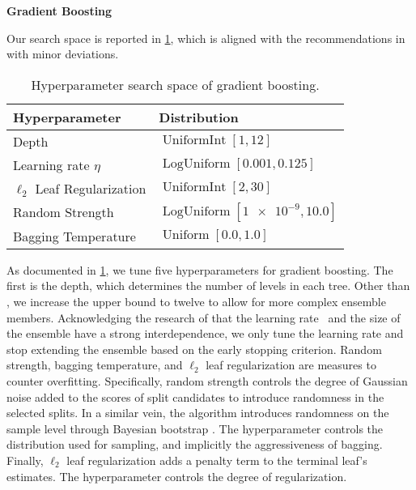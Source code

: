 \textbf{Gradient Boosting}

Our search space is reported in \cref{tab:hyperparameter-space-gbm}, which is aligned with the recommendations in \textcites[][20]{prokhorenkovaCatBoostUnbiasedBoosting2018}[][18]{gorishniyRevisitingDeepLearning2021}[][4]{rubachevRevisitingPretrainingObjectives2022} with minor deviations.

\begin{table}[!h]
    \centering
    \caption[Hyperparameter Search Space of Gradient Boosting]{Hyperparameter search space of gradient boosting.}
    \label{tab:hyperparameter-space-gbm}
    \begin{tabular}{@{}ll@{}}
        \toprule
        Hyperparameter               & Distribution                                  \\ \midrule
        Depth                        & $\operatorname{UniformInt}[1,12]$             \\
        Learning rate $\eta$         & $\operatorname{LogUniform}[0.001, 0.125]$     \\
        $\ell_2$ Leaf Regularization & $\operatorname{UniformInt}[2, 30]$            \\
        Random Strength              & $\operatorname{LogUniform}[\num{1e-9}, 10.0]$ \\
        Bagging Temperature          & $\operatorname{Uniform}[0.0, 1.0]$            \\ \bottomrule
    \end{tabular}
\end{table}

As documented in \cref{tab:hyperparameter-space-gbm}, we tune five hyperparameters for gradient boosting. The first is the depth, which determines the number of levels in each tree. Other than \textcite[][]{gorishniyRevisitingDeepLearning2021}, we increase the upper bound to twelve to allow for more complex ensemble members. Acknowledging the research of \textcite[][14]{friedmanGreedyFunctionApproximation2001} that the learning rate \eta~and the size of the ensemble have a strong interdependence, we only tune the learning rate and stop extending the ensemble based on the early stopping criterion. Random strength, bagging temperature, and $\ell_2$ leaf regularization are measures to counter overfitting. Specifically, random strength controls the degree of Gaussian noise added to the scores of split candidates to introduce randomness in the selected splits. In a similar vein, the algorithm introduces randomness on the sample level through Bayesian bootstrap \autocite[][130--131]{rubinBayesianBootstrap1981}. The hyperparameter controls the distribution used for sampling, and implicitly the aggressiveness of bagging. Finally, $\ell_2$ leaf regularization adds a penalty term to the terminal leaf's estimates. The hyperparameter controls the degree of regularization.

